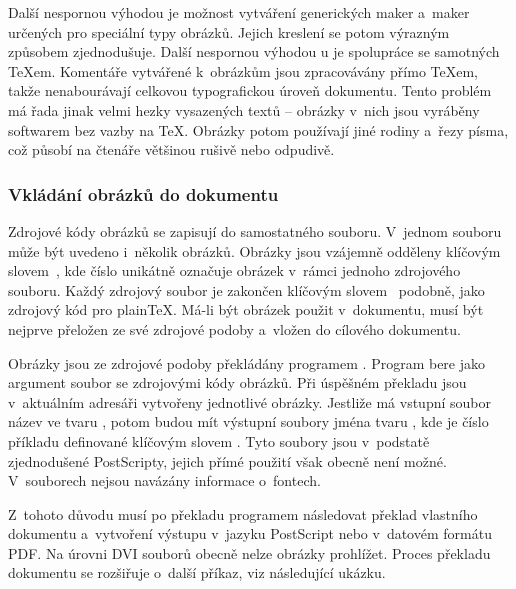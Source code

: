\documentclass[12pt]{article}
\begin{document}
\medskip
Další nespornou výhodou je možnost vytváření generických maker a~maker určených
pro speciální typy obrázků. Jejich kreslení se potom výrazným způsobem 
zjednodušuje. Další nespornou výhodou \MP u je spolupráce se samotných \TeX em.
Komentáře vytvářené k~obrázkům jsou zpracovávány přímo \TeX em, takže 
nenabourávají celkovou typografickou úroveň dokumentu. Tento problém má řada
jinak velmi hezky vysazených textů -- obrázky v~nich jsou vyráběny softwarem
bez vazby na \TeX.
Obrázky potom používají jiné rodiny a~řezy písma, což působí na čtenáře
většinou rušivě nebo odpudivě.

\subsubsection*{Vkládání obrázků do dokumentu}
Zdrojové kódy obrázků se zapisují do samostatného souboru. V~jednom souboru
může být uvedeno i~několik obrázků. Obrázky jsou vzájemně odděleny klíčovým
slovem~, kde číslo unikátně označuje obrázek v~rámci
jednoho zdrojového souboru. Každý zdrojový soubor je zakončen 
klíčovým slovem~ podobně, jako zdrojový kód pro plain\TeX.
Má-li být obrázek použit v~dokumentu, musí být nejprve přeložen ze své
zdrojové podoby a~vložen do cílového dokumentu.

\medskip
Obrázky jsou ze zdrojové podoby překládány programem . Program
bere jako argument soubor se zdrojovými kódy obrázků. Při úspěšném překladu
jsou v~aktuálním adresáři vytvořeny jednotlivé obrázky. Jestliže má vstupní
soubor název ve tvaru , potom budou mít výstupní soubory
jména tvaru , kde  je číslo příkladu
definované klíčovým slovem . Tyto soubory jsou
v~podstatě zjednodušené PostScripty, jejich přímé použití však obecně není 
možné. V~souborech nejsou navázány informace o~fontech.

\medskip
Z~tohoto důvodu musí po překladu programem  následovat překlad 
vlastního dokumentu a~vytvoření výstupu v~jazyku PostScript nebo v~datovém
formátu PDF. Na úrovni DVI souborů obecně nelze obrázky prohlížet. Proces
překladu dokumentu se rozšiřuje o~další příkaz, viz následující ukázku.

\begin{flushleft}
   \\
   \\
   \\
\end{flushleft}
\end{document}
